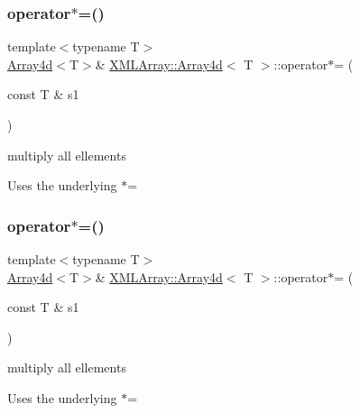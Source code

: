 \subsubsection{\texorpdfstring{operator$\ast$=()}{operator*=()}\hspace{0.1cm}{\footnotesize\ttfamily [5/6]}}
{\footnotesize\ttfamily template$<$typename T$>$ \\
\mbox{\hyperlink{classXMLArray_1_1Array4d}{Array4d}}$<$T$>$\& \mbox{\hyperlink{classXMLArray_1_1Array4d}{X\+M\+L\+Array\+::\+Array4d}}$<$ T $>$\+::operator$\ast$= (\begin{DoxyParamCaption}\item[{const T \&}]{s1 }\end{DoxyParamCaption})\hspace{0.3cm}{\ttfamily [inline]}}



multiply all ellements 

Uses the underlying $\ast$= \mbox{\label{classXMLArray_1_1Array4d_ac8c9fbcc39636658f94e7adc00c172b3}} 
\subsubsection{\texorpdfstring{operator$\ast$=()}{operator*=()}\hspace{0.1cm}{\footnotesize\ttfamily [6/6]}}
{\footnotesize\ttfamily template$<$typename T$>$ \\
\mbox{\hyperlink{classXMLArray_1_1Array4d}{Array4d}}$<$T$>$\& \mbox{\hyperlink{classXMLArray_1_1Array4d}{X\+M\+L\+Array\+::\+Array4d}}$<$ T $>$\+::operator$\ast$= (\begin{DoxyParamCaption}\item[{const T \&}]{s1 }\end{DoxyParamCaption})\hspace{0.3cm}{\ttfamily [inline]}}



multiply all ellements 

Uses the underlying $\ast$= \mbox{\label{classXMLArray_1_1Array4d_a3ee4e8302e86bcfec817cae81a5fe1bf}} 
